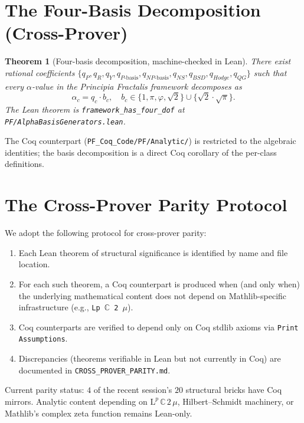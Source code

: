 \documentclass[11pt,a4paper]{article}
\newtheorem{theorem}{Theorem}[section]
\theoremstyle{definition}
\begin{document}
\section{The Four-Basis Decomposition (Cross-Prover)}

\begin{theorem}[Four-basis decomposition, machine-checked in Lean]
\label{thm:four-basis-cross-prover}
There exist rational coefficients $\{q_P, q_R, q_Y, q_{P\text{-basis}},
q_{NP\text{-basis}}, q_{NS}, q_{BSD}, q_{Hodge}, q_{QG}\}$ such that
every $\alpha$-value in the Principia Fractalis framework decomposes as
\[
\alpha_c = q_c \cdot b_c,
\quad
b_c \in \{1, \pi, \varphi, \sqrt{2}\} \cup \{\sqrt{2}\cdot\sqrt{\pi}\}.
\]
The Lean theorem is \texttt{framework\_has\_four\_dof} at
\texttt{PF/AlphaBasisGenerators.lean}.
\end{theorem}

The Coq counterpart (\texttt{PF\_Coq\_Code/PF/Analytic/}) is
restricted to the algebraic identities; the basis decomposition is a
direct Coq corollary of the per-class definitions.

\section{The Cross-Prover Parity Protocol}

We adopt the following protocol for cross-prover parity:

\begin{enumerate}
\item Each Lean theorem of structural significance is identified by
name and file location.
\item For each such theorem, a Coq counterpart is produced when (and
only when) the underlying mathematical content does not depend on
Mathlib-specific infrastructure (e.g., \texttt{Lp $\mathbb{C}$ 2 $\mu$}).
\item Coq counterparts are verified to depend only on Coq stdlib axioms
via \texttt{Print Assumptions}.
\item Discrepancies (theorems verifiable in Lean but not currently in
Coq) are documented in \texttt{CROSS\_PROVER\_PARITY.md}.
\end{enumerate}

Current parity status: $4$ of the recent session's $20$ structural
bricks have Coq mirrors. Analytic content depending on
$\mathrm{L}^p\,\mathbb{C}\,2\,\mu$, Hilbert--Schmidt machinery, or
Mathlib's complex zeta function remains Lean-only.
\end{document}
